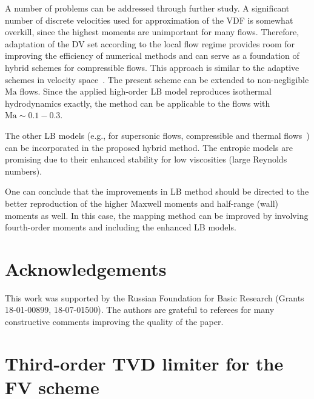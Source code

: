 \documentclass{elsarticle} %
\newcommand{\Ma}{\mathrm{Ma}}
\begin{document}
A number of problems can be addressed through further study.
A significant number of discrete velocities used for approximation of the VDF is somewhat overkill,
since the highest moments are unimportant for many flows.
Therefore, adaptation of the DV set according to the local flow regime provides room for improving the efficiency of numerical methods
and can serve as a foundation of hybrid schemes for compressible flows.
This approach is similar to the adaptive schemes in velocity space~\cite{Aristov1977, Kolobov2013, Baranger2014}.
The present scheme can be extended to non-negligible $\Ma$ flows. Since the applied high-order LB model reproduces isothermal hydrodynamics exactly, the method can be applicable to the flows with $\Ma \sim 0.1-0.3$.

The other LB models (e.g., for supersonic flows, compressible and thermal flows~\cite{Chen2010, Frapolli2015, Frapolli2016})
can be incorporated in the proposed hybrid method.
The entropic models are promising due to their enhanced stability for low viscosities (large Reynolds numbers).


One can conclude that the improvements in LB method should be directed
to the better reproduction of the higher Maxwell moments and half-range (wall) moments as well.
In this case, the mapping method can be improved by involving fourth-order moments
and including the enhanced LB models.

\section*{Acknowledgements}

This work was supported by the Russian Foundation for Basic Research (Grants 18-01-00899, 18-07-01500).
The authors are grateful to referees for many constructive comments improving the quality of the paper.

\appendix

\section{Third-order TVD limiter for the FV scheme}\label{sec:limiter}
\end{document}
